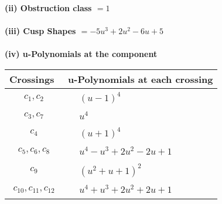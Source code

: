 \documentclass[1p]{elsarticle_modified}
\theoremstyle{definition}
\begin{document}
\flushleft \textbf{(ii) Obstruction class $= 1$}\\~\\
\flushleft \textbf{(iii) Cusp Shapes $= -5 u^3+2 u^2-6 u+5$}\\~\\
\newpage\renewcommand{\arraystretch}{1}
\flushleft \textbf{(iv) u-Polynomials at the component}\newline \\
\begin{tabular}{m{50pt}|m{274pt}}
Crossings & \hspace{64pt}u-Polynomials at each crossing \\
\hline $$\begin{aligned}c_{1},c_{2}\end{aligned}$$&$\begin{aligned}
&(u-1)^4
\end{aligned}$\\
\hline $$\begin{aligned}c_{3},c_{7}\end{aligned}$$&$\begin{aligned}
&u^4
\end{aligned}$\\
\hline $$\begin{aligned}c_{4}\end{aligned}$$&$\begin{aligned}
&(u+1)^4
\end{aligned}$\\
\hline $$\begin{aligned}c_{5},c_{6},c_{8}\end{aligned}$$&$\begin{aligned}
&u^4- u^3+2 u^2-2 u+1
\end{aligned}$\\
\hline $$\begin{aligned}c_{9}\end{aligned}$$&$\begin{aligned}
&(u^2+u+1)^2
\end{aligned}$\\
\hline $$\begin{aligned}c_{10},c_{11},c_{12}\end{aligned}$$&$\begin{aligned}
&u^4+u^3+2 u^2+2 u+1
\end{aligned}$\\
\hline
\end{tabular}\\~\\
\end{document}
